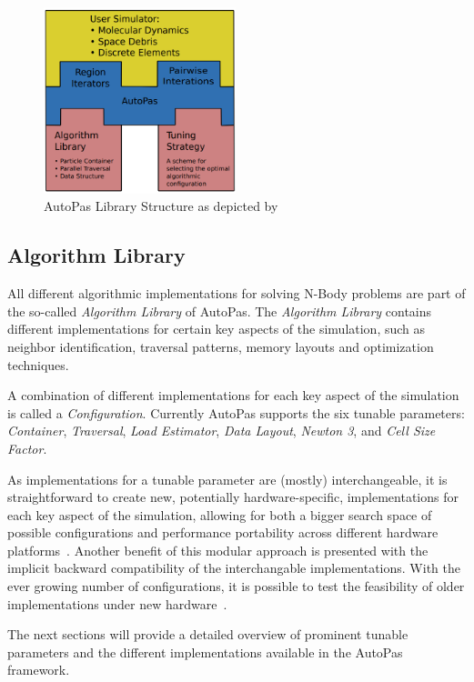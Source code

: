 \documentclass[conference]{IEEEtran}
\begin{document}
\begin{figure}[H]
    \centering
    \includegraphics[width=2.2in]{figures/AutoPasLibraryStructure.png}
    \caption{AutoPas Library Structure as depicted by~\cite{Newcome2023Poster}}
    \label{fig_architecture}
\end{figure}

\subsection{Algorithm Library}

All different algorithmic implementations for solving N-Body problems are part of the so-called \textit{Algorithm Library} of AutoPas. The \textit{Algorithm Library} contains different implementations for certain key aspects of the simulation, such as neighbor identification, traversal patterns, memory layouts and optimization techniques.

A combination of different implementations for each key aspect of the simulation is called a \textit{Configuration}. Currently AutoPas supports the six tunable parameters: \textit{Container}, \textit{Traversal}, \textit{Load Estimator}, \textit{Data Layout}, \textit{Newton 3}, and \textit{Cell Size Factor}.

As implementations for a tunable parameter are (mostly) interchangeable, it is straightforward to create new, potentially hardware-specific, implementations for each key aspect of the simulation, allowing for both a bigger search space of possible configurations and performance portability across different hardware platforms~\cite{Tchipev2020}. Another benefit of this modular approach is presented with the implicit backward compatibility of the interchangable implementations. With the ever growing number of configurations, it is possible to test the feasibility of older implementations under new hardware~\cite{Tchipev2020}.

The next sections will provide a detailed overview of prominent tunable parameters and the different implementations available in the AutoPas framework.
\end{document}
